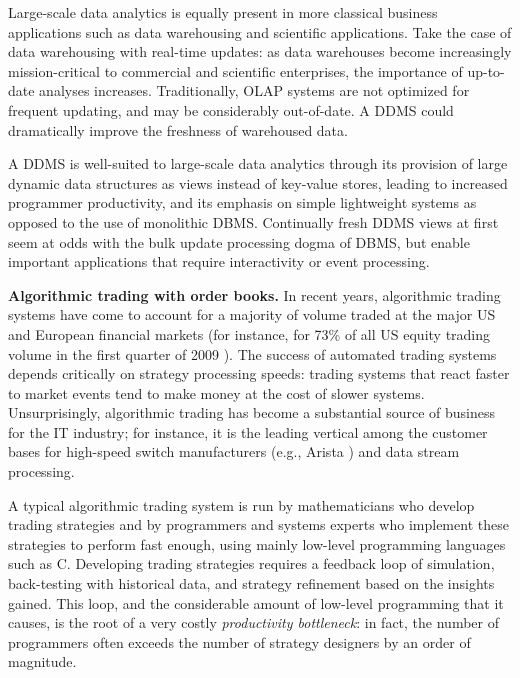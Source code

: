 Large-scale data analytics is equally present in more classical business
applications such as data warehousing and scientific applications. Take the
case of data warehousing with real-time updates: as data warehouses become
increasingly mission-critical to commercial and scientific enterprises, the
importance of up-to-date analyses increases. Traditionally, OLAP systems are not
optimized for frequent updating, and may be considerably out-of-date. A DDMS 
could dramatically improve the freshness of warehoused data.

A DDMS is well-suited to large-scale data analytics through its provision of
large dynamic data structures as views instead of key-value stores, leading to
increased programmer productivity, and its emphasis on simple lightweight
systems as opposed to the use of monolithic DBMS. Continually fresh DDMS views
at first seem at odds with the bulk update processing dogma of DBMS, but enable
important applications that require interactivity or event processing.

\medskip


{\bf Algorithmic trading with order books.}\/
In recent years, algorithmic trading systems have come to account for a majority
of volume traded at the major US and European financial markets (for instance,
for 73\% of all US equity trading volume in the first quarter of 2009
\cite{Iati2009}). The success of automated trading systems depends critically on
strategy processing speeds: trading systems that react faster to market events
tend to make money at the cost of slower systems. Unsurprisingly, algorithmic
trading has become a substantial source of business for the IT industry; for
instance, it is the leading vertical among the customer bases for high-speed
switch manufacturers (e.g., Arista \cite{Becht2010}) and data stream processing.




A typical algorithmic trading system is run by mathematicians who develop
trading strategies and by programmers and systems experts who implement these
strategies to perform fast enough, using mainly low-level programming languages
such as C. Developing trading strategies requires a feedback loop of simulation,
back-testing with historical data, and strategy refinement based on the insights
gained. This loop, and the considerable amount of low-level programming that it
causes, is the root of a very costly {\em productivity bottleneck}\/: in fact,
the number of programmers often exceeds the number of strategy designers by
an order of magnitude.


